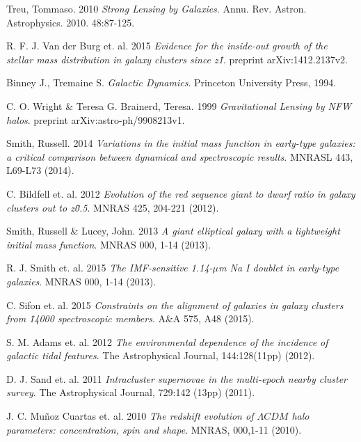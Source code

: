 \documentclass[a4paper, 11pt, oneside]{Thesis}  %
\begin{document}
\begin{thebibliography}{9}

Treu, Tommaso. 2010
\textit{Strong Lensing by Galaxies}. 
Annu. Rev. Astron. Astrophysics. 2010. 48:87-125.

R. F. J. Van der Burg et. al. 2015
\textit{Evidence for the inside-out growth of the stellar mass distribution in galaxy clusters since z\~1}. 
preprint arXiv:1412.2137v2.

Binney J., Tremaine S.  
\textit{Galactic Dynamics}. 
Princeton University Press, 1994.

C. O. Wright \& Teresa G. Brainerd, Teresa. 1999 
\textit{Gravitational Lensing by NFW halos}. 
preprint arXiv:astro-ph/9908213v1.

Smith, Russell. 2014
\textit{Variations in the initial mass function in early-type galaxies: a critical comparison between dynamical and spectroscopic results}.
MNRASL 443, L69-L73 (2014).

C. Bildfell et. al. 2012
\textit{Evolution of the red sequence giant to dwarf ratio in galaxy clusters out to z\~0.5}.
MNRAS 425, 204-221 (2012).

Smith, Russell \& Lucey, John. 2013  
\textit{A giant elliptical galaxy with a lightweight initial mass function}.
MNRAS 000, 1-14 (2013).

R. J. Smith et. al. 2015 
\textit{The IMF-sensitive 1.14-$\mu$m Na I doublet in early-type galaxies}.
MNRAS 000, 1-14 (2013).

C. Sifon et. al. 2015
\textit{Constraints on the alignment of galaxies in galaxy clusters from \~14000 spectroscopic members}.
A\&A 575, A48 (2015).

S. M. Adams et. al. 2012
\textit{The environmental dependence of the incidence of galactic tidal features}.
The Astrophysical Journal, 144:128(11pp) (2012).

D. J. Sand et. al. 2011
\textit{Intracluster supernovae in the multi-epoch nearby cluster survey}.
The Astrophysical Journal, 729:142 (13pp) (2011).

J. C. Mu\~noz Cuartas et. al. 2010
\textit{The redshift evolution of $\Lambda CDM$ halo parameters: concentration, spin and shape}.
MNRAS, 000,1-11 (2010).

\end{thebibliography}

\label{Bibliography}
\end{document}
